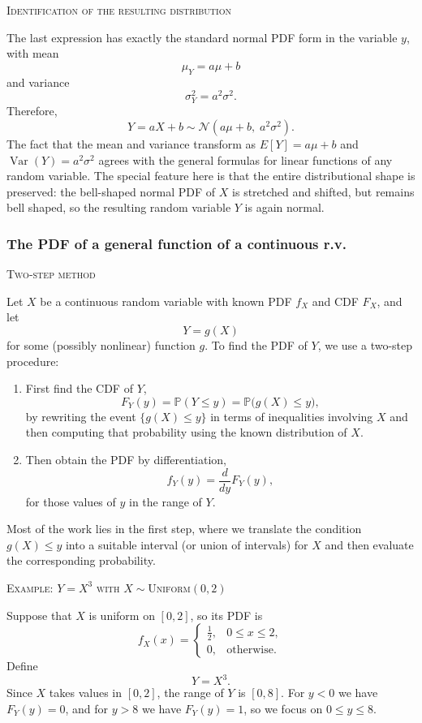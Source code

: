\textsc{Identification of the resulting distribution}

The last expression has exactly the standard normal PDF form in the variable \(y\), with mean
\[
\mu_{Y} = a\mu + b
\]
and variance
\[
\sigma_{Y}^{2} = a^{2}\sigma^{2}.
\]
Therefore,
\[
Y = aX + b
\sim
\mathcal{N}(a\mu + b,\; a^{2}\sigma^{2}).
\]
The fact that the mean and variance transform as \(E[Y] = a\mu + b\) and \(\operatorname{Var}(Y) = a^{2}\sigma^{2}\) agrees with the general formulas for linear functions of any random variable.  
The special feature here is that the entire distributional shape is preserved: the bell-shaped normal PDF of \(X\) is stretched and shifted, but remains bell shaped, so the resulting random variable \(Y\) is again normal.  


\subsubsection{The PDF of a general function of a continuous r.v.}

\textsc{Two-step method}

Let \(X\) be a continuous random variable with known PDF \(f_X\) and CDF \(F_X\), and let
\[
Y = g(X)
\]
for some (possibly nonlinear) function \(g\).  
To find the PDF of \(Y\), we use a two-step procedure:
\begin{enumerate}
\item First find the CDF of \(Y\),
\[
F_Y(y)
=
\mathbb{P}(Y \le y)
=
\mathbb{P}\big(g(X) \le y\big),
\]
by rewriting the event \(\{g(X) \le y\}\) in terms of inequalities involving \(X\) and then computing that probability using the known distribution of \(X\).  
\item Then obtain the PDF by differentiation,
\[
f_Y(y)
=
\frac{d}{dy}F_Y(y),
\]
for those values of \(y\) in the range of \(Y\).  
\end{enumerate}
Most of the work lies in the first step, where we translate the condition \(g(X)\le y\) into a suitable interval (or union of intervals) for \(X\) and then evaluate the corresponding probability.

\textsc{Example: \(Y = X^{3}\) with \(X \sim \text{Uniform}(0,2)\)}

Suppose that \(X\) is uniform on \([0,2]\), so its PDF is
\[
f_X(x)
=
\begin{cases}
\frac{1}{2}, & 0 \le x \le 2,\\[4pt]
0, & \text{otherwise}.
\end{cases}
\]
Define
\[
Y = X^{3}.
\]
Since \(X\) takes values in \([0,2]\), the range of \(Y\) is \([0,8]\).  
For \(y<0\) we have \(F_Y(y)=0\), and for \(y>8\) we have \(F_Y(y)=1\), so we focus on \(0 \le y \le 8\).

